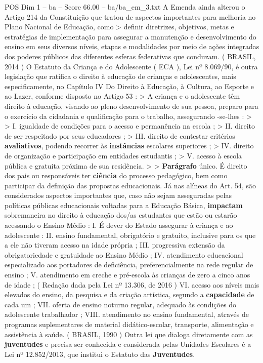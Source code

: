 \begin{textsample}{POS Dim 1 – ba – Score 66.00 – ba/ba\_em\_3.txt}
A Emenda ainda alterou o Artigo 214 da Constituição que tratou de aspectos importantes para melhoria no Plano Nacional de Educação, como > definir diretrizes, objetivos, metas e estratégias de implementação para assegurar a manutenção e desenvolvimento do ensino em seus diversos níveis, etapas e modalidades por meio de ações integradas dos poderes públicos das diferentes esferas federativas que conduzam. ( BRASIL, 2014 ) O Estatuto da Criança e do Adolescente ( ECA ), Lei nº 8.069/90, é outra legislação que ratifica o direito à educação de crianças e adolescentes, mais especificamente, no Capítulo IV Do Direito à Educação, à Cultura, ao Esporte e ao Lazer, conforme disposto no Artigo 53 : > A criança e o adolescente têm direito à educação, visando ao pleno desenvolvimento de sua pessoa, preparo para o exercício da cidadania e qualificação para o trabalho, assegurando -se-lhes : > > I. igualdade de condições para o acesso e permanência na escola ; > II. direito de ser respeitado por seus educadores ; > III. direito de contestar critérios \textbf{avaliativos}, podendo recorrer às \textbf{instâncias} escolares superiores ; > IV. direito de organização e participação em entidades estudantis ; > V. acesso à escola pública e gratuita próxima de sua residência. > > \textbf{Parágrafo} único.
É direito dos pais ou responsáveis ter \textbf{ciência} do processo pedagógico, bem como participar da definição das propostas educacionais.
Já nas alíneas do Art. 54, são considerados aspectos importantes que, caso não sejam asseguradas pelas políticas públicas educacionais voltadas para a Educação Básica, \textbf{impactam} sobremaneira no direito à educação dos/as estudantes que estão ou estarão acessando o Ensino Médio : I.
É dever do Estado assegurar à criança e ao adolescente : II. ensino fundamental, obrigatório e gratuito, inclusive para os que a ele não tiveram acesso na idade própria ; III. progressiva extensão da obrigatoriedade e gratuidade ao Ensino Médio ; IV. atendimento educacional especializado aos portadores de deficiência, preferencialmente na rede regular de ensino ; V. atendimento em creche e pré-escola às crianças de zero a cinco anos de idade ; ( Redação dada pela Lei nº 13.306, de 2016 ) VI. acesso aos níveis mais elevados do ensino, da pesquisa e da criação artística, segundo a \textbf{capacidade} de cada um ; VII. oferta de ensino noturno regular, adequado às condições do adolescente trabalhador ; VIII. atendimento no ensino fundamental, através de programas suplementares de material didático-escolar, transporte, alimentação e assistência à saúde. ( BRASIL, 1990 ) Outra lei que dialoga diretamente com as \textbf{juventudes} e precisa ser conhecida e considerada pelas Unidades Escolares é a Lei nº 12.852/2013, que institui o Estatuto das \textbf{Juventudes}.

\end{textsample}
